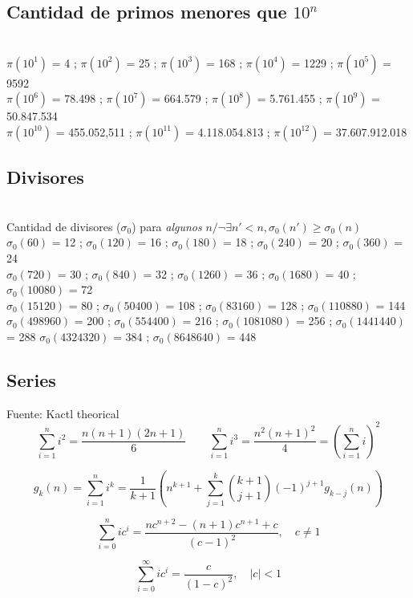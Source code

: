 \subsection{Cantidad de primos menores que $10^n$}\ \\
$\pi(10^1)$ = 4 ;
$\pi(10^2)$ = 25 ;
$\pi(10^3)$ = 168 ;
$\pi(10^4)$ = 1229 ;
$\pi(10^5)$ = 9592 \\
$\pi(10^6)$ = 78.498 ;
$\pi(10^7)$ = 664.579 ;
$\pi(10^8)$ = 5.761.455 ;
$\pi(10^9)$ = 50.847.534 \\
$\pi(10^{10})$ = 455.052,511 ;
$\pi(10^{11})$ = 4.118.054.813 ;
$\pi(10^{12})$ = 37.607.912.018%

\subsection{Divisores} \ \\
Cantidad de divisores ($\sigma_0$) para \emph{algunos} $n / \neg\exists n'<n, \sigma_0(n') \geqslant \sigma_0(n)$ \\
$\sigma_0(60)$ = 12 ; $\sigma_0(120)$ = 16 ; $\sigma_0(180)$ = 18 ; $\sigma_0(240)$ = 20 ; $\sigma_0(360)$ = 24 \\
$\sigma_0(720)$ = 30 ; $\sigma_0(840)$ = 32 ; $\sigma_0(1260)$ = 36 ; $\sigma_0(1680)$ = 40 ; $\sigma_0(10080)$ = 72 \\ $\sigma_0(15120)$ = 80 ; $\sigma_0(50400)$ = 108 ; $\sigma_0(83160)$ = 128 ; $\sigma_0(110880)$ = 144 \\
$\sigma_0(498960)$ = 200 ; $\sigma_0(554400)$ = 216 ; $\sigma_0(1081080)$ = 256 ; $\sigma_0(1441440)$ = 288  $\sigma_0(4324320)$ = 384 ; $\sigma_0(8648640)$ = 448


\subsection{Series}
Fuente: Kactl theorical \\

$$\sum_{i=1}^{n} i^{2} = \frac{n(n+1)(2n+1)}{6}  \qquad  \sum_{i=1}^{n} i^{3} = \frac{n^{2}(n+1)^{2}}{4} = \left(\sum_{i=1}^n i\right)^2$$

$$ g_k(n) = \sum_{i=1}^n i^k = \frac{1}{k+1} \left( n^{k+1} + \sum_{j=1}^k \binom{k+1}{j+1} (-1)^{j+1} g_{k-j}(n) \right) $$

$$\sum_{i=0}^{n} ic^{i} = \frac{nc^{n+2} - (n+1)c^{n+1} + c}{(c-1)^{2}}, \quad c \neq 1$$

$$\sum_{i=0}^{\infty} ic^{i} = \frac{c}{(1-c)^{2}}, \quad |c| < 1$$


